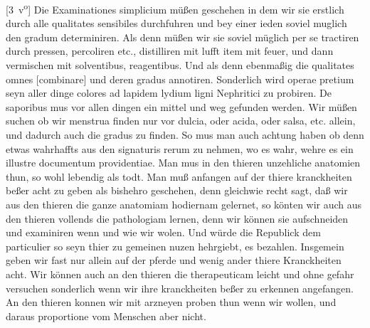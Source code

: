 [3~v\textsuperscript{o}]
\pend%
\pstart%
Die Examinationes simplicium m\"{u}{\ss}en geschehen in dem wir sie erstlich durch alle qualitates sensibiles\protect{} durchfuhren und bey einer ieden soviel muglich den gradum determiniren.
Als denn m\"{u}{\ss}en wir sie soviel m\"{u}glich per se tractiren durch pressen, percoliren\protect{} etc., distilliren\protect{} mit lufft item mit feuer, und dann vermischen mit solventibus\protect{}, reagentibus\protect{}.
Und als denn ebenma{\ss}ig die qualitates omnes
[combinare]
und deren gradus annotiren.
\pend%
\pstart%
Sonderlich wird operae pretium seyn aller dinge colores ad lapidem lydium\protect{} ligni Nephritici\protect{} zu probiren.
\pend%
\pstart%
De saporibus\protect{} mus vor allen dingen ein mittel und weg gefunden werden.
\pend%
\pstart%
Wir m\"{u}{\ss}en suchen ob wir menstrua\protect{} finden nur vor dulcia\protect{}, oder acida\protect{}, oder salsa\protect{}, etc. allein, und dadurch auch die gradus zu finden.
\pend%
\pstart%
So mus man auch achtung haben ob denn etwas wahrhaffts aus den signaturis rerum zu nehmen, wo es wahr, wehre es ein illustre documentum providentiae.
\pend%
\pstart%
Man mus in den thieren unzehliche anatomien\protect{} thun, so wohl lebendig als todt.
\pend%
\pstart%
Man mu{\ss} anfangen auf der thiere kranckheiten\protect{} be{\ss}er acht zu geben als bishehro geschehen, denn gleichwie
%
recht sagt, da{\ss} wir aus den thieren die ganze anatomiam\protect{} hodiernam gelernet, so k\"{o}nten wir auch aus den thieren vollends die pathologiam\protect{} lernen, denn wir k\"{o}nnen sie aufschneiden und examiniren wenn und wie wir wolen. Und w\"{u}rde die Republick dem particulier so seyn thier zu gemeinen nuzen hehrgiebt, es bezahlen.
\pend%
\pstart%
Insgemein geben wir fast nur allein auf der pferde\protect{} und wenig ander thiere Kranck\-hei\-ten\protect{} acht.
\pend%
\newpage
\pstart%
Wir k\"{o}nnen auch an den thieren die therapeuticam\protect{} leicht und ohne gefahr versuchen sonderlich wenn wir ihre kranckheiten\protect{} be{\ss}er zu erkennen angefangen. An den thieren konnen wir mit arzneyen\protect{} proben thun wenn wir wollen, und daraus proportione vom Menschen
aber nicht.%
